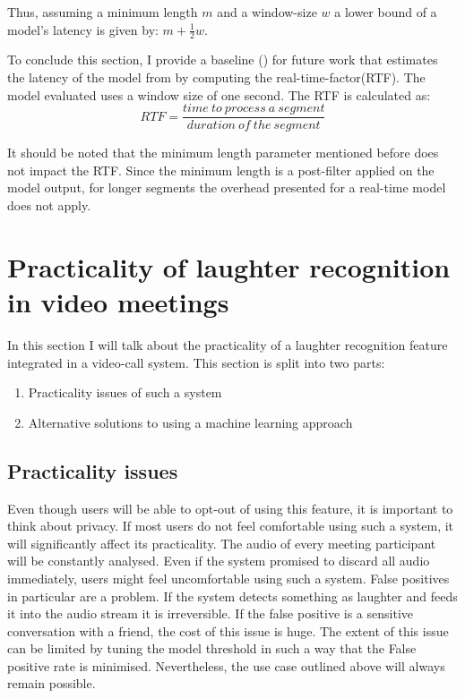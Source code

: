 \documentclass[bsc,frontabs,parskip,deptreport]{infthesis}
\begin{document}
Thus, assuming a minimum length $m$ and a window-size $w$ a lower bound of a model's latency is given by: $m + \frac{1}{2}w$.

To conclude this section, I provide a baseline () for future work that estimates the latency of the model from \citet{gillick2021robust} by computing the real-time-factor(RTF). 
The model evaluated uses a window size of one second. 
The RTF is calculated as: 
$$ RTF = \frac{time\ to\ process\ a\ segment}{duration\ of\ the\ segment} $$

It should be noted that the minimum length parameter mentioned before does not impact the RTF. 
Since the minimum length is a post-filter applied on the model output, for longer segments the overhead presented for a real-time model does not apply. 


\chapter{Practicality of laughter recognition in video meetings}
In this section I will talk about the practicality of a laughter recognition feature integrated in a video-call system. 
This section is split into two parts: 
\begin{enumerate}
    \item Practicality issues of such a system
    \item Alternative solutions to using a machine learning approach 
\end{enumerate}

\section{Practicality issues} \label{sec:general-pract}
Even though users will be able to opt-out of using this feature, it is important to think about privacy. If most users do not feel comfortable using such a system, it will significantly affect its practicality.  
The audio of every meeting participant will be constantly analysed. Even if the system promised to discard all audio immediately, users might feel uncomfortable using such a system. False positives in particular are a problem. If the system detects something as laughter and feeds it into the audio stream it is irreversible. If the false positive is a sensitive conversation with a friend, the cost of this issue is huge. 
The extent of this issue can be limited by tuning the model threshold in such a way that the False positive rate is minimised. Nevertheless, the use case outlined above will always remain possible. 
\end{document}
